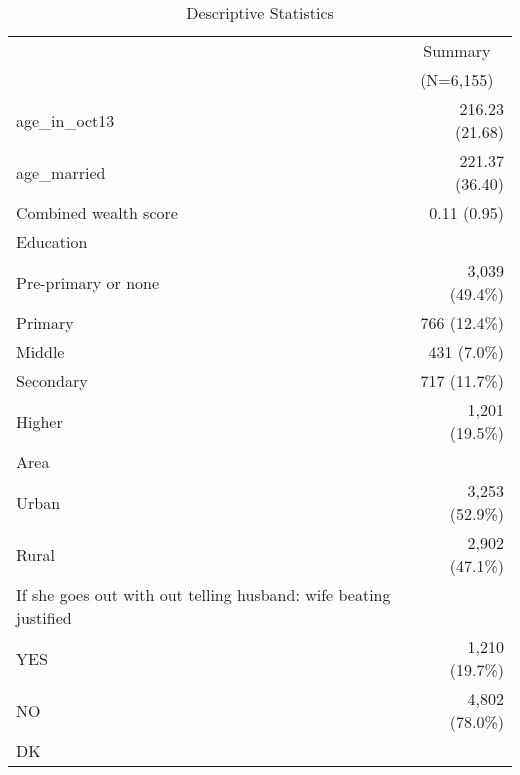 \documentclass{article}
\begin{document}
\begin{table}[!h]
\caption{Descriptive Statistics}
\centering
\begin{tabular}{ll}
\cline{1-2}
\multicolumn{1}{r}{} &
  \multicolumn{1}{c}{Summary} \\
\multicolumn{1}{r}{} &
  \multicolumn{1}{c}{(N=6,155)} \\
\cline{1-2}
\multicolumn{1}{l}{age\_in\_oct13} &
  \multicolumn{1}{r}{216.23 (21.68)} \\
\multicolumn{1}{l}{age\_married} &
  \multicolumn{1}{r}{221.37 (36.40)} \\
\multicolumn{1}{l}{Combined wealth score} &
  \multicolumn{1}{r}{0.11 (0.95)} \\
\multicolumn{1}{l}{Education} &
  \multicolumn{1}{r}{} \\
\multicolumn{1}{l}{\hspace{1em}Pre-primary or none} &
  \multicolumn{1}{r}{3,039 (49.4\%)} \\
\multicolumn{1}{l}{\hspace{1em}Primary} &
  \multicolumn{1}{r}{766 (12.4\%)} \\
\multicolumn{1}{l}{\hspace{1em}Middle} &
  \multicolumn{1}{r}{431 (7.0\%)} \\
\multicolumn{1}{l}{\hspace{1em}Secondary} &
  \multicolumn{1}{r}{717 (11.7\%)} \\
\multicolumn{1}{l}{\hspace{1em}Higher} &
  \multicolumn{1}{r}{1,201 (19.5\%)} \\
\multicolumn{1}{l}{Area} &
  \multicolumn{1}{r}{} \\
\multicolumn{1}{l}{\hspace{1em}Urban} &
  \multicolumn{1}{r}{3,253 (52.9\%)} \\
\multicolumn{1}{l}{\hspace{1em}Rural} &
  \multicolumn{1}{r}{2,902 (47.1\%)} \\
\multicolumn{1}{l}{If she goes out with out telling husband: wife beating justified} &
  \multicolumn{1}{r}{} \\
\multicolumn{1}{l}{\hspace{1em}YES} &
  \multicolumn{1}{r}{1,210 (19.7\%)} \\
\multicolumn{1}{l}{\hspace{1em}NO} &
  \multicolumn{1}{r}{4,802 (78.0\%)} \\
\multicolumn{1}{l}{\hspace{1em}DK} &

\end{tabular}
\end{table}
\end{document}
